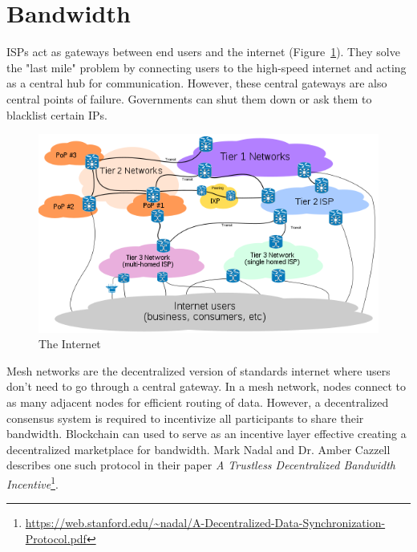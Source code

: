 \section{Bandwidth}
	ISPs act as gateways between end users and the internet (Figure~\ref{fig:internet-backbone}). They solve the "last mile" problem by connecting users to the high-speed internet and acting as a central hub for communication. However, these central gateways are also central points of failure. Governments can shut them down or ask them to blacklist certain IPs\cite{raval2016decentralized}.
	
	\begin{figure}[h]
		\includegraphics[width=\linewidth]{figures/internet-backbone}
		\caption{\label{fig:internet-backbone} The Internet\protect\footnotemark}
	\end{figure}
	
	Mesh networks are the decentralized version of standards internet where users don't need to go through a central gateway. In a mesh network, nodes connect to as many adjacent nodes for efficient routing of data. However, a decentralized consensus system is required to incentivize all participants to share their bandwidth. Blockchain can used to serve as an incentive layer effective creating a decentralized marketplace for bandwidth. Mark Nadal and Dr. Amber Cazzell describes one such protocol in their paper \textit{A Trustless Decentralized Bandwidth Incentive}\footnote{\url{https://web.stanford.edu/~nadal/A-Decentralized-Data-Synchronization-Protocol.pdf}}.
	